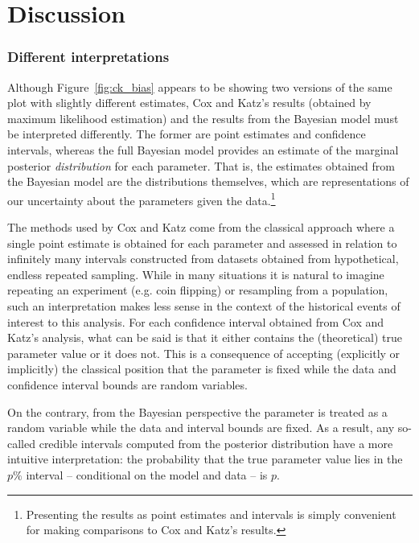 \section{Discussion}
\label{ck_discussion}

\subsubsection{Different interpretations}

Although Figure~\ref{fig:ck_bias} appears to be showing two versions of the same plot with
slightly different estimates, Cox and Katz's results (obtained by maximum likelihood estimation) 
and the results from the Bayesian model must be interpreted differently. The former are point estimates 
and confidence intervals, whereas the full Bayesian model provides an estimate of the marginal posterior 
{\it distribution} for each parameter. That is, the estimates obtained from the Bayesian model are the 
distributions themselves, which are representations of our uncertainty about the parameters 
given the data.\footnote{Presenting the results as point estimates and intervals is simply convenient for 
making comparisons to Cox and Katz's results.} 

The methods used by Cox and Katz come from the classical approach where a single point 
estimate is obtained for each parameter and assessed in relation to infinitely many intervals 
constructed from datasets obtained from hypothetical, endless repeated sampling. While in many 
situations it is natural to imagine repeating an experiment (e.g. coin flipping) or resampling from 
a population, such an interpretation makes less sense in the context of the historical 
events of interest to this analysis. For each confidence interval obtained from Cox and Katz's analysis, 
what can be said is that it either contains the (theoretical) true parameter value or it does not. This is 
a consequence of accepting (explicitly or implicitly) the classical position that the parameter is fixed 
while the data and confidence interval bounds are random variables. 

On the contrary, from the Bayesian perspective the parameter is treated as a random variable while 
the data and interval bounds are fixed. As a result, any so-called credible intervals computed from the 
posterior distribution have a more intuitive interpretation: the probability that the true parameter value lies 
in the $p\%$ interval  -- conditional on the model and data -- is $p$. 

